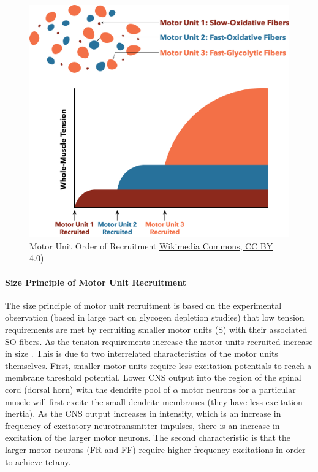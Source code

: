 \begin{figure}[!ht]
    \centering
    \includegraphics[width=1\linewidth]{./figure/Motor_unit_recruitment.png}
    \caption{Motor Unit Order of Recruitment \footnotesize{\href{https://commons.wikimedia.org/wiki/File:Motor_unit_recruitment.png}{Wikimedia Commons, CC BY 4.0})}}
    \label{fig:Motor_unit_recruitment}
\end{figure}

\paragraph{Size Principle of Motor Unit Recruitment}

The size principle of motor unit recruitment is based on the experimental observation (based in large part on glycogen depletion studies) that low tension requirements are met by recruiting smaller motor units (S) with their associated SO fibers. As the tension requirements increase the motor units recruited increase in size \cite{henneman_rank_1974}. This is due to two interrelated characteristics of the motor units themselves. First, smaller motor units require less excitation potentials to reach a membrane threshold potential. Lower CNS output into the region of the spinal cord (dorsal horn) with the dendrite pool of $\alpha$ motor neurons for a particular muscle will first excite the small dendrite membranes (they have less excitation inertia). As the CNS output increases in intensity, which is an increase in frequency of excitatory neurotransmitter impulses, there is an increase in excitation of the larger motor neurons. The second characteristic is that the larger motor neurons (FR and FF) require higher frequency excitations in order to achieve tetany.

